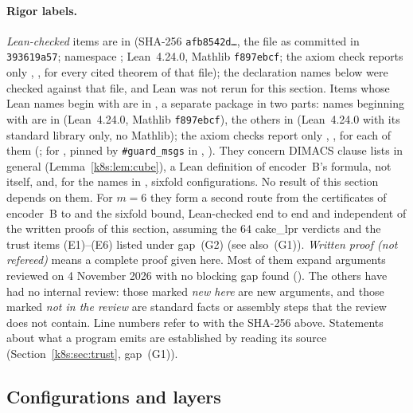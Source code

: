 \paragraph{Rigor labels.} \emph{Lean-checked} items are in  (SHA-256
\texttt{afb8542d\dots}, the file as committed in \texttt{393619a57}; namespace ;
Lean~4.24.0, Mathlib \texttt{f897ebcf}; the axiom check  reports only ,
,  for every cited theorem of that file); the declaration names below were
checked against that file, and Lean was not rerun for this section. Items whose Lean names begin with  are in , a separate
package in two parts: names beginning with  are in  (Lean~4.24.0, Mathlib
\texttt{f897ebcf}), the others in  (Lean~4.24.0 with its standard library only, no Mathlib); the
axiom checks report only , ,  for each of them
(; for , pinned by \texttt{\#guard\_msgs} in
, ). They concern DIMACS
clause lists in general (Lemma~\ref{k8s:lem:cube}), a Lean definition of encoder~B's formula, not
 itself, and, for the names in , sixfold configurations. No result of this section depends on them. For $m=6$ they form a second route from the
certificates of encoder~B to  and the sixfold bound, Lean-checked end to end and independent of the
written proofs of this section, assuming the $64$ cake\_lpr verdicts and the trust items (E1)--(E6) listed under
gap~(G2) (see also~(G1)). \emph{Written proof (not refereed)} means a
complete proof given here. Most of them expand arguments reviewed on 4 November 2026 with no blocking gap found
(). The others have had no internal review: those marked \emph{new here} are new
arguments, and those marked \emph{not in the review} are standard facts or assembly steps that the review does not
contain. Line numbers refer to  with the SHA-256 above. Statements about what a program emits are
established by reading its source (Section~\ref{k8s:sec:trust}, gap~(G1)).

\subsection{Configurations and layers}\label{k8s:sec:setting}

